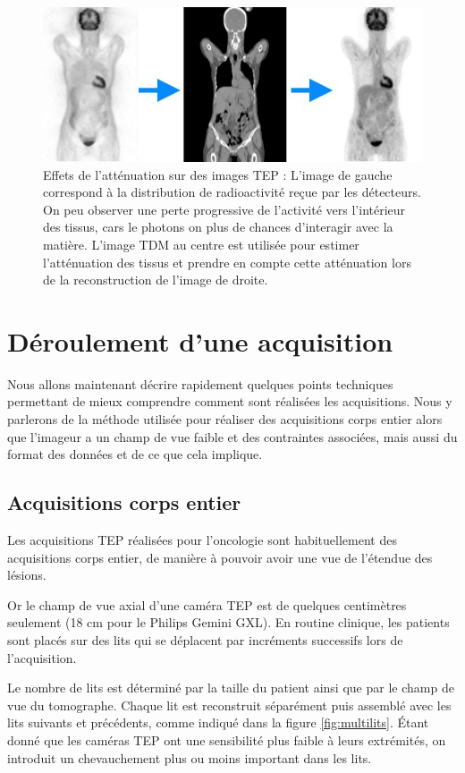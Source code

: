 \begin{figure}
\centering
\includegraphics[width=12cm]{images/attenuationNonAtt}
\caption[Effet de l'atténuation sur les images TEP]{Effets de l'atténuation sur des images TEP : L'image de gauche correspond à la distribution de radioactivité reçue par les détecteurs. On peu observer une perte progressive de l'activité vers l'intérieur des tissus, cars le photons on plus de chances d'interagir avec la matière. L'image TDM au centre est utilisée pour estimer l'atténuation des tissus et prendre en compte cette atténuation lors de la reconstruction de l'image de droite.}
\label{fig:schemaAtt}
\end{figure}


\chapter{Déroulement d'une acquisition}

Nous allons maintenant décrire rapidement quelques points techniques permettant de mieux comprendre comment sont réalisées les acquisitions. Nous y parlerons de la méthode utilisée pour réaliser des acquisitions corps entier alors que l'imageur a un champ de vue faible et des contraintes associées, mais aussi du format des données et de ce que cela implique.

	\section{Acquisitions corps entier}


Les acquisitions TEP réalisées pour l'oncologie sont habituellement des acquisitions corps entier, de manière à pouvoir avoir une vue de l'étendue des lésions.

Or le champ de vue axial d'une caméra TEP est de quelques centimètres seulement (18 cm pour le Philips Gemini GXL). En routine clinique, les patients sont placés sur des lits qui se déplacent par incréments successifs lors de l'acquisition.

Le nombre de lits est déterminé par la taille du patient ainsi que par le champ de vue du tomographe. Chaque lit est reconstruit séparément puis assemblé avec les lits suivants et précédents, comme indiqué dans la figure \ref{fig:multilits}. \'Etant donné que les caméras TEP ont une sensibilité plus faible à leurs extrémités, on introduit un chevauchement plus ou moins important dans les lits.

